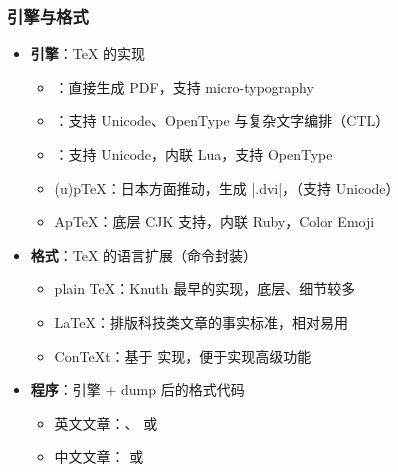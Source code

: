
\begin{frame}[fragile]
  \frametitle{引擎与格式}
  \begin{itemize}
    \item \textbf{引擎}：\TeX{} 的实现

      \begin{itemize}
        \item \pdfTeX{}：直接生成 PDF，支持 micro-typography
        \item \XeTeX{}：支持 Unicode、OpenType 与复杂文字编排（CTL）
        \item \LuaTeX{}：支持 Unicode，内联 Lua，支持 OpenType
        \item (u)p\TeX{}：日本方面推动，生成 |.dvi|，（支持 Unicode）
        \item Ap\TeX{}：底层 CJK 支持，内联 Ruby，Color Emoji
      \end{itemize}

    \item \textbf{格式}：\TeX{} 的语言扩展（命令封装）

      \begin{itemize}
        \item plain \TeX{}：Knuth 最早的实现，底层、细节较多
        \item \LaTeX{}：排版科技类文章的事实标准，相对易用
        \item Con\TeX t：基于 \LuaTeX{} 实现，便于实现高级功能
      \end{itemize}

    \item \textbf{程序}：引擎 + dump 后的格式代码

      \begin{itemize}
        \item \alert{英文文章：\pdfLaTeX{}、\XeLaTeX{} 或 \LuaLaTeX{}}
        \item \alert{中文文章：\XeLaTeX{} 或 \LuaLaTeX{}}
      \end{itemize}
  \end{itemize}
\end{frame}

